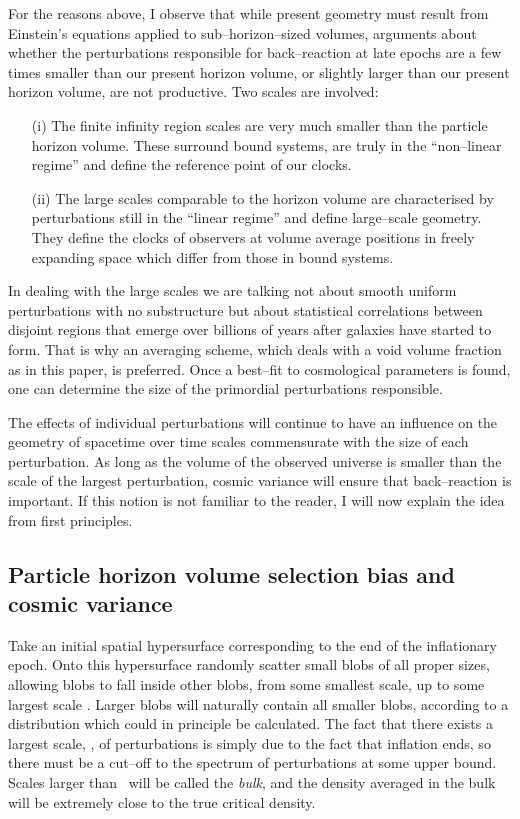 \documentclass[12pt]{article}
\begin{document}
For the reasons above, I observe that while present geometry must result
from Einstein's equations applied to sub--horizon--sized volumes, arguments
about whether the perturbations responsible for back--reaction at late
epochs are a few times smaller than our present horizon volume, or slightly
larger than our present horizon volume, are not productive. Two scales are
involved:
\begin{itemize}
\item[(i)] The finite infinity region scales are very much smaller
than the particle horizon volume. These surround bound systems,
are truly in the ``non--linear regime'' and define the reference point of
our clocks.
\item[(ii)] The large scales comparable to the horizon volume are
characterised by perturbations still in the ``linear regime'' and define
large--scale geometry. They define the clocks of observers at volume average
positions in freely expanding space which differ from those in bound systems.
\end{itemize}
In dealing with the large scales we are talking not about smooth
uniform perturbations with no substructure but about statistical
correlations between disjoint regions that emerge over billions of years
after galaxies have started to form. That
is why an averaging scheme, which deals with a void volume fraction as
in this paper, is preferred. Once a best--fit to cosmological parameters
is found, one can determine the size of the primordial perturbations
responsible.

The effects of individual perturbations will continue to have an influence on
the geometry of spacetime over time scales commensurate with the size of each
perturbation. As long as the volume of the observed universe is smaller
than the scale of the largest perturbation, cosmic variance will ensure that
back--reaction is important. If this notion is not familiar to the
reader, I will now explain the idea from first principles.

\subsection{Particle horizon volume selection bias and cosmic variance}

Take an initial spatial
hypersurface corresponding to the end of the inflationary epoch. Onto this
hypersurface randomly scatter small blobs of all proper sizes, allowing
blobs to fall inside other blobs, from some
smallest scale, up to some largest scale \BB. Larger blobs
will naturally contain all smaller blobs, according to a distribution
which could in principle be calculated. The fact that there exists a
largest scale, \BB, of perturbations is simply due to the fact that
inflation ends, so there must be a cut--off to the spectrum of
perturbations at some upper bound. Scales larger than \BB\
will be called the {\em bulk}, and the density averaged in the bulk
will be extremely close to the true critical density.
\end{document}
